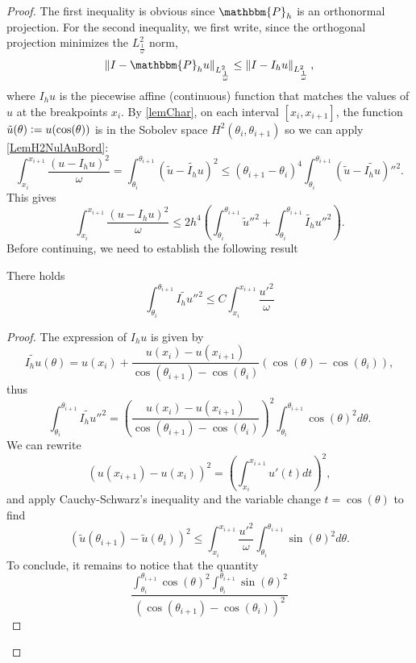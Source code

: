 \documentclass[a4paper]{article}
\begin{document}
\begin{proof}
	The first inequality is obvious since $\mathbbm{P}_h$ is an orthonormal projection. For the second inequality, we first write, since the orthogonal projection minimizes the $L^2_\frac{1}{\omega}$ norm,
	\begin{equation}
	\norm{I - \mathbbm{P}_h u}_{L^2_\frac{1}{\omega}} \leq \norm{I - I_h u}_{L^2_\frac{1}{\omega}},
	\label{estimProjParInterp}
	\end{equation}
	where $I_h u$ is the piecewise affine (continuous) function that matches the values of $u$ at the breakpoints $x_i$. By \autoref{lemChar}, on each interval $[x_i, x_{i+1}]$, the function $\tilde{u}(\theta) \mathrel{\mathop:}= u(\cos(\theta))$ is in the Sobolev space $H^2(\theta_i,\theta_{i+1})$ so we can apply \autoref{LemH2NulAuBord}:
	\[ \int_{x_i}^{x_{i+1}} \frac{(u - I_h u)^2}{\omega} = \int_{\theta_i}^{\theta_{i+1}} (\tilde{u}- \tilde{I_h}u)^2 \leq (\theta_{i+1} - \theta_i)^4 \int_{\theta_{i}}^{\theta_{i+1}} (\tilde{u} - \tilde{I_hu})''^2. \]
	This gives
	\begin{equation}
	\int_{x_i}^{x_{i+1}} \frac{(u - I_h u)^2}{\omega} \leq 2h^4 \left(\int_{\theta_i}^{\theta_{i+1}} \tilde{u}''^2 + \int_{\theta_i}^{\theta_{i+1}} \tilde{I_h}u''^2 \right).
	\label{enCoursDePreuve}
	\end{equation}
	Before continuing, we need to establish the following result
	\begin{Lem}
		There holds 
		\[ \int_{\theta_i}^{\theta_{i+1}} \widetilde{I_hu}''^2 \leq C \int_{x_i}^{x_{i+1}} \frac{u'^2}{\omega}\]
	\end{Lem}
	\begin{proof}
		The expression of $I_h u$ is given by
		\[\widetilde{I_h u}(\theta) = u(x_i) + \frac{u(x_i) - u(x_{i+1})}{\cos(\theta_{i+1}) - \cos(\theta_i)} (\cos(\theta) - \cos(\theta_i)),\]
		thus
		\[\int_{\theta_i}^{\theta_{i+1}} \widetilde{I_hu}''^2 = \left(\frac{u(x_i) - u(x_{i+1})}{\cos(\theta_{i+1}) - \cos(\theta_i)}\right)^2 \int_{\theta_i}^{\theta_{i+1}} \cos(\theta)^2 d\theta.\]
		We can rewrite 
		\[\left(u(x_{i+1}) - u(x_i)\right)^2 = \left( \int_{x_i}^{x_{i+1}} u'(t)dt\right)^2,\]
		and apply Cauchy-Schwarz's inequality and the variable change $t = \cos(\theta)$ to find 
		\[\left(\tilde{u}(\theta_{i+1}) - \tilde{u}(\theta_i)\right)^2 \leq \int_{x_i}^{x_{i+1}} \frac{u'^2}{\omega} \int_{\theta_i}^{\theta_{i+1}} \sin(\theta)^2 d\theta.\]
		To conclude, it remains to notice that the quantity
		\[\frac{ \int_{\theta_i}^{\theta_{i+1}} \cos(\theta)^2\int_{\theta_i}^{\theta_{i+1}} \sin(\theta)^2}{(\cos(\theta_{i+1}) - \cos(\theta_i))^2}\]

\end{proof}
\end{proof}
\end{document}
